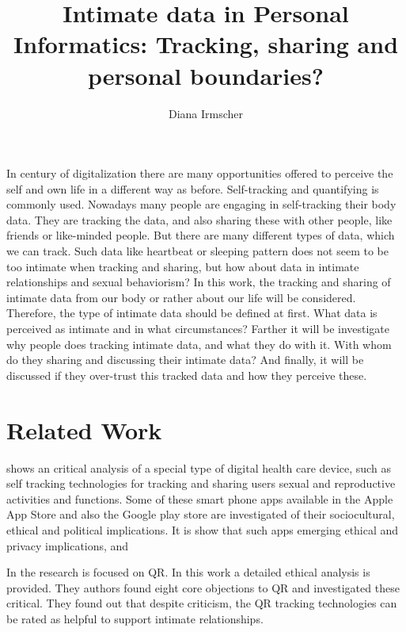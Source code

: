 \documentclass[journal]{vgtc}                %
\title{Intimate data in Personal Informatics: Tracking, sharing and personal boundaries?}
\author{Diana Irmscher}
\begin{document}

\maketitle

%
%
In century of digitalization there are many opportunities offered to perceive the self and own life in a different way as before. Self-tracking and quantifying is commonly used. Nowadays many people are engaging in self-tracking their body data. They are tracking the data, and also sharing these with other people, like friends or like-minded people. But there are many different types of data, which we can track. Such data like heartbeat or sleeping pattern does not seem to be too intimate when tracking and sharing, but how about data in intimate relationships and sexual behaviorism? In this work, the tracking and sharing of intimate data from our body or rather about our life will be considered. Therefore, the type of intimate data should be defined at first. What data is perceived as intimate and in what circumstances? Farther it will be investigate why people does tracking intimate data, and what they do with it. With whom do they sharing and discussing their intimate data? And finally, it will  be discussed if they over-trust this tracked data and how they perceive these.


\section{Related Work}
\cite{doi:10.1080/13691058.2014.920528} shows an critical analysis of a special type of digital health care device, such as self tracking technologies for tracking and sharing users sexual and reproductive activities and functions. Some of these smart phone apps available in the Apple App Store and also the Google play store are investigated of their sociocultural, ethical and political implications. It is show that such apps emerging ethical and privacy implications, and 

In \cite{doi:10.1080/15265161.2017.1409823} the research is focused on \ac{QR}. In this work a detailed ethical analysis is provided. They authors found eight core objections to \acs{QR} and investigated these critical. They found out that despite criticism, the \acs{QR} tracking technologies can be rated as helpful to support intimate relationships.
\end{document}
